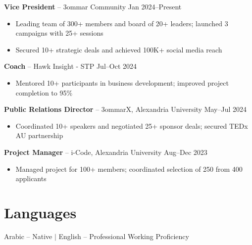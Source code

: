 \documentclass[11pt,a4paper]{article}
\begin{document}
\textbf{Vice President} -- 3ommar Community \hfill Jan 2024--Present
\begin{itemize}[leftmargin=0.5cm, itemsep=1pt, topsep=2pt, label={-}]
    \item Leading team of 300+ members and board of 20+ leaders; launched 3 campaigns with 25+ sessions
    \item Secured 10+ strategic deals and achieved 100K+ social media reach
\end{itemize}

\vspace{4pt}

\textbf{Coach} -- Hawk Insight - STP \hfill Jul--Oct 2024
\begin{itemize}[leftmargin=0.5cm, itemsep=1pt, topsep=2pt, label={-}]
    \item Mentored 10+ participants in business development; improved project completion to 95\%
\end{itemize}

\vspace{4pt}

\textbf{Public Relations Director} -- 3ommarX, Alexandria University \hfill May--Jul 2024
\begin{itemize}[leftmargin=0.5cm, itemsep=1pt, topsep=2pt, label={-}]
    \item Coordinated 10+ speakers and negotiated 25+ sponsor deals; secured TEDx AU partnership
\end{itemize}

\vspace{4pt}

\textbf{Project Manager} -- i-Code, Alexandria University \hfill Aug--Dec 2023
\begin{itemize}[leftmargin=0.5cm, itemsep=1pt, topsep=2pt, label={-}]
    \item Managed project for 100+ members; coordinated selection of 250 from 400 applicants
\end{itemize}

\section*{Languages}

Arabic -- Native $|$ English -- Professional Working Proficiency
\end{document}
